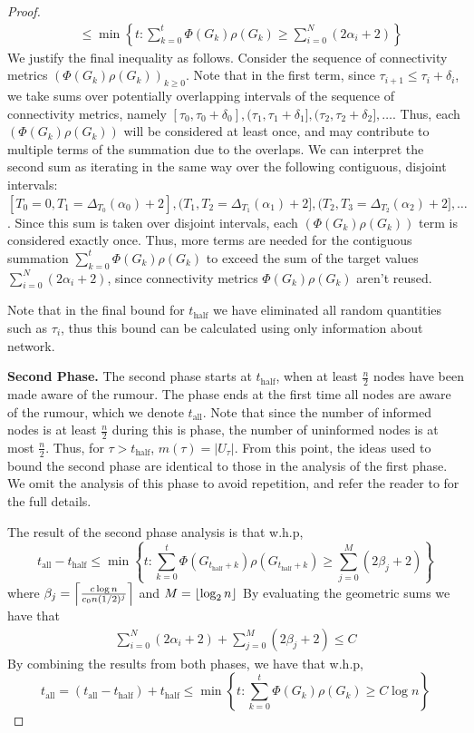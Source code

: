 \begin{proof}
\begin{align*}
		&\leq \min \left\{t: \sum_{k=0}^t \Phi(G_k)\rho(G_k) \geq \sum_{i=0}^N (2 \alpha_i + 2) \right\}
	\end{align*}
	We justify the final inequality as follows. Consider the sequence of connectivity metrics $(\Phi(G_k)\rho(G_k))_{k \geq 0}$.
	Note that in the first term, since $\tau_{i+1} \leq \tau_i + \delta_i$, we take sums over potentially overlapping intervals of the sequence of connectivity metrics, namely $[\tau_0, \tau_0 + \delta_0], (\tau_1, \tau_1 + \delta_1], (\tau_2, \tau_2 + \delta_2], \dots$. Thus, each $(\Phi(G_k)\rho(G_k))$ will be considered at least once, and may contribute to multiple terms of the summation due to the overlaps. We can interpret the second sum as iterating in the same way over the following contiguous, disjoint intervals: $[T_0 = 0, T_1 = \Delta_{T_0}(\alpha_0) + 2], (T_1, T_2 = \Delta_{T_1}(\alpha_1) + 2], (T_2, T_3 = \Delta_{T_2}(\alpha_2) + 2], \dots$. Since this sum is taken over disjoint intervals, each $(\Phi(G_k)\rho(G_k))$ term is considered exactly once. Thus, more terms are needed for the contiguous summation $\sum_{k=0}^t \Phi(G_k)\rho(G_k)$ to exceed the sum of the target values $\sum_{i=0}^N (2 \alpha_i + 2)$, since connectivity metrics $\Phi(G_k)\rho(G_k)$ aren't reused.

	Note that in the final bound for $t_\text{half}$ we have eliminated all random quantities such as $\tau_i$, thus this bound can be calculated using only information about network.

	\textbf{Second Phase.} The second phase starts at $t_\text{half}$, when at least $\frac{n}{2}$ nodes have been made aware of the rumour. The phase ends at the first time all nodes are aware of the rumour, which we denote $t_\text{all}$. Note that since the number of informed nodes is at least $\frac{n}{2}$ during this is phase, the number of uninformed nodes is at most $\frac{n}{2}$. Thus, for $\tau > t_\text{half}$, $m(\tau) = |U_\tau|$. From this point, the ideas used to bound the second phase are identical to those in the analysis of the first phase. We omit the analysis of this phase to avoid repetition, and refer the reader to \cite{asyncPaper} for the full details. 

	The result of the second phase analysis is that w.h.p,
	$$
		t_\text{all} - t_\text{half} 
		\leq \min \left\{t: \sum_{k=0}^t \Phi(G_{t_\text{half} +k}) \rho(G_{t_\text{half} +k}) \geq \sum_{j=0}^M (2 \beta_j + 2) \right\}
	$$
	where $\beta_j = \ceil*{\frac{c \log n}{c_0 n(1/2)^j}}$ and $M = \floor*{\log_2 n}$
	By evaluating the geometric sums we have that 
	\begin{align*}
		\sum_{i=0}^N (2 \alpha_i + 2) + \sum_{j=0}^M (2 \beta_j + 2) \leq C
	\end{align*}
	By combining the results from both phases, we have that w.h.p,
	$$
		t_\text{all} = (t_\text{all} - t_\text{half}) + t_\text{half} \leq \min \left\{t : \sum_{k=0}^t \Phi(G_k)\rho(G_k) \geq C \log n \right\} 
	$$
\end{proof}

